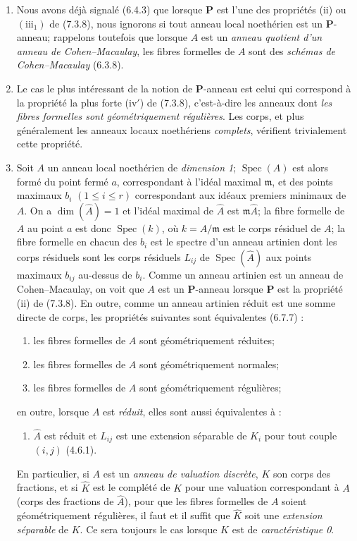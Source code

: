 \begin{remarks}[7.3.19]
\begin{enumerate}
\item[\emph{ii)}] Nous avons déjà signalé (6.4.3) que lorsque $\boldsymbol P$ est
l'une des propriétés (ii) ou $(\mathrm{iii}_1)$ de (7.3.8), nous ignorons
si tout anneau local noethérien est un $\boldsymbol P$-anneau; rappelons
toutefois que lorsque $A$ est un \emph{anneau quotient d'un anneau de
Cohen--Macaulay}, les fibres formelles de $A$ sont des \emph{schémas de
Cohen--Macaulay} (6.3.8).
\item[\emph{iii)}] Le cas le plus intéressant de la notion de $\boldsymbol P$-anneau
est celui qui correspond à la propriété la plus forte (iv$'$) de
(7.3.8), c'est-à-dire les anneaux dont \emph{les fibres formelles sont
géométriquement régulières}. Les corps, et plus généralement les anneaux
locaux noethériens \emph{complets}, vérifient trivialement cette
propriété.
\item[\emph{iv)}] Soit $A$ un anneau local noethérien de \emph{dimension 1};
$\operatorname{Spec}(A)$ est alors formé du point fermé $a$,
correspondant à l'idéal maximal $\mathfrak m$, et des points maximaux
$b_i$ $(1\leqslant i\leqslant r)$ correspondant aux idéaux premiers
minimaux de $A$. On a $\dim(\widehat A)=1$ et l'idéal maximal de
$\widehat A$ est $\mathfrak m\widehat A$; la fibre formelle de $A$ au
point $a$ est donc $\operatorname{Spec}(k)$, où $k=A/\mathfrak m$ est le
corps résiduel de $A$; la fibre formelle en chacun des $b_i$ est le
spectre d'un anneau artinien dont les corps résiduels sont les corps
résiduels $L_{ij}$ de $\operatorname{Spec}(\widehat A)$ aux points
maximaux $b_{ij}$ au-dessus de $b_i$. Comme un anneau artinien est un
anneau de Cohen--Macaulay, on voit que $A$ est un
$\boldsymbol P$-anneau lorsque $\boldsymbol P$ est la propriété (ii) de
(7.3.8). En outre, comme un anneau artinien réduit est une somme directe
de corps, les propriétés suivantes sont équivalentes (6.7.7) :
\begin{enumerate}
\item[\emph{a)}] les fibres formelles de $A$ sont géométriquement réduites;
\item[\emph{b)}] les fibres formelles de $A$ sont géométriquement normales;
\item[\emph{c)}] les fibres formelles de $A$ sont géométriquement régulières;
\end{enumerate}
en outre, lorsque $A$ est \emph{réduit}, elles sont aussi équivalentes à :
\begin{enumerate}
\item[\emph{d)}] $\widehat A$ est réduit et $L_{ij}$ est une extension séparable de
$K_i$ pour tout couple $(i,j)$ (4.6.1).
\end{enumerate}
En particulier, si $A$ est un \emph{anneau de valuation discrète}, $K$
son corps des fractions, et si $\widehat K$ est le complété de $K$ pour
une valuation correspondant à $A$ (corps des fractions de $\widehat A$),
pour que les fibres formelles de $A$ soient géométriquement régulières,
il faut et il suffit que $\widehat K$ soit une \emph{extension séparable}
de $K$. Ce sera toujours le cas lorsque $K$ est de \emph{caractéristique
0}.
\end{enumerate}
\end{remarks}

